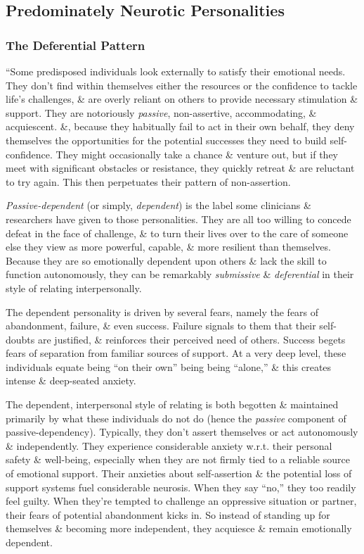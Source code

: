 \documentclass{article}
\numberwithin{equation}{section}
\begin{document}
\subsection{Predominately Neurotic Personalities}

\subsubsection{The Deferential Pattern}
``Some predisposed individuals look externally to satisfy their emotional needs. They don't find within themselves either the resources or the confidence to tackle life's challenges, \& are overly reliant on others to provide necessary stimulation \& support. They are notoriously \textit{passive}, non-assertive, accommodating, \& acquiescent. \&, because they habitually fail to act in their own behalf, they deny themselves the opportunities for the potential successes they need to build self-confidence. They might occasionally take a chance \& venture out, but if they meet with significant obstacles or resistance, they quickly retreat \& are reluctant to try again. This then perpetuates their pattern of non-assertion.

\textit{Passive-dependent} (or simply, \textit{dependent}) is the label some clinicians \& researchers have given to those personalities. They are all too willing to concede defeat in the face of challenge, \& to turn their lives over to the care of someone else they view as more powerful, capable, \& more resilient than themselves. Because they are so emotionally dependent upon others \& lack the skill to function autonomously, they can be remarkably \textit{submissive} \& \textit{deferential} in their style of relating interpersonally.

The dependent personality is driven by several fears, namely the fears of abandonment, failure, \& even success. Failure signals to them that their self-doubts are justified, \& reinforces their perceived need of others. Success begets fears of separation from familiar sources of support. At a very deep level, these individuals equate being ``on their own'' being being ``alone,'' \& this creates intense \& deep-seated anxiety.

The dependent, interpersonal style of relating is both begotten \& maintained primarily by what these individuals do not do (hence the \textit{passive} component of passive-dependency). Typically, they don't assert themselves or act autonomously \& independently. They experience considerable anxiety w.r.t. their personal safety \& well-being, especially when they are not firmly tied to a reliable source of emotional support. Their anxieties about self-assertion \& the potential loss of support systems fuel considerable neurosis. When they say ``no,'' they too readily feel guilty. When they're tempted to challenge an oppressive situation or partner, their fears of potential abandonment kicks in. So instead of standing up for themselves \& becoming more independent, they acquiesce \& remain emotionally dependent.
\end{document}
